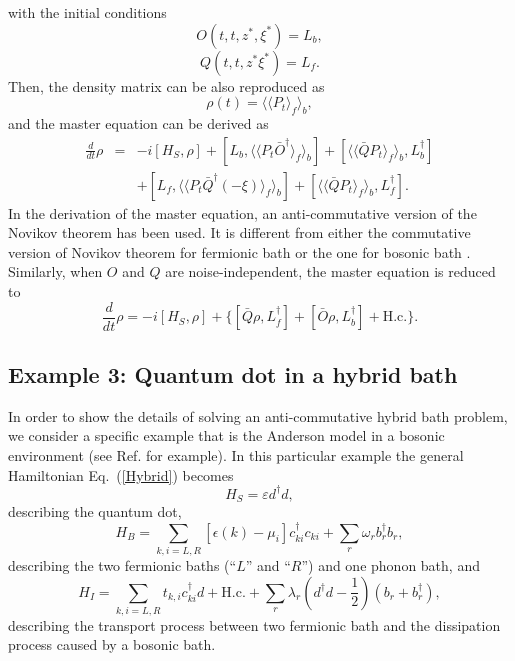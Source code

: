 \documentclass[preprint]{elsarticle}
\begin{document}
\noindent with the initial conditions 
\begin{equation}
O(t,t,z^{*},\xi^{*})=L_{b},
\end{equation}
\begin{equation}
Q(t,t,z^{*}\xi^{*})=L_{f}.
\end{equation}
Then, the density matrix can be also reproduced as
\begin{equation}
\rho(t)=\langle\langle P_{t}\rangle_{f}\rangle_{b},
\end{equation}
and the master equation can be derived as
\begin{eqnarray}
\frac{d}{dt}\rho & = & -i[H_{S},\rho]+[L_{b},\langle\langle P_{t}\bar{O}^{\dagger}\rangle_{f}\rangle_{b}]+[\langle\langle\bar{Q}P_{t}\rangle_{f}\rangle_{b},L_{b}^{\dagger}]\nonumber \\
 &  & +[L_{f},\langle\langle P_{t}\bar{Q}^{\dagger}(-\xi)\rangle_{f}\rangle_{b}]+[\langle\langle\bar{Q}P_{t}\rangle_{f}\rangle_{b},L_{f}^{\dagger}].\label{MEQAC}
\end{eqnarray}
In the derivation of the master equation, an anti-commutative version
of the Novikov theorem \cite{ShiFB,ChenFB} has been used. It is different
from either the commutative version of Novikov theorem for fermionic
bath \cite{ZhaoFB} or the one for bosonic bath \cite{Yu1999}. Similarly,
when $O$ and $Q$ are noise-independent, the master equation is reduced
to
\begin{equation}
\frac{d}{dt}\rho=-i[H_{S},\rho]+\{[\bar{Q}\rho,L_{f}^{\dagger}]+[\bar{O}\rho,L_{b}^{\dagger}]+\mathrm{H.c.}\}.
\end{equation}



\subsection{Example 3: Quantum dot in a hybrid bath}

\label{sec:IV-B}

In order to show the details of solving an anti-commutative hybrid
bath problem, we consider a specific example that is the Anderson
model in a bosonic environment (see Ref. \cite{Chung} for example).
In this particular example the general Hamiltonian Eq.~(\ref{Hybrid})
becomes 
\begin{equation}
H_{S}=\varepsilon d^{\dagger}d,
\end{equation}
describing the quantum dot,
\begin{equation}
H_{B}=\sum_{k,i=L,R}[\epsilon(k)-\mu_{i}]c_{ki}^{\dagger}c_{ki}+\sum_{r}\omega_{r}b_{r}^{\dagger}b_{r},
\end{equation}
 describing the two fermionic baths (``$L$'' and ``$R$'') and one
phonon bath, and 
\begin{equation}
H_{I}=\sum_{k,i=L,R}t_{k,i}c_{ki}^{\dagger}d+\mathrm{H.c.}+\sum_{r}\lambda_{r}(d^{\dagger}d-\frac{1}{2})(b_{r}+b_{r}^{\dagger}),\label{HI}
\end{equation}
describing the transport process between two fermionic bath and the dissipation process caused by a bosonic bath.
\end{document}
